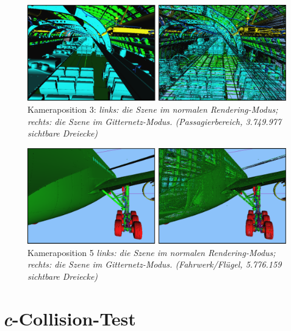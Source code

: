 \begin{figure}
\centering
\includegraphics[scale=0.40]{images/pos3.pdf}
\caption{\label{fig:eval:pos3}Kameraposition 3: \textit{links: die Szene im normalen Rendering-Modus; rechts: die Szene im Gitternetz-Modus. (Passagierbereich, 3.749.977 sichtbare Dreiecke)}}
\end{figure}

\begin{figure}
\centering
\includegraphics[scale=0.40]{images/pos5.pdf}
\caption{\label{fig:eval:pos5}Kameraposition 5 \textit{links: die Szene im normalen Rendering-Modus; rechts: die Szene im Gitternetz-Modus. (Fahrwerk/Flügel, 5.776.159 sichtbare Dreiecke)}}
\end{figure}

\section{\textit{c}-Collision-Test}
\label{sec:eval:ccollision}

